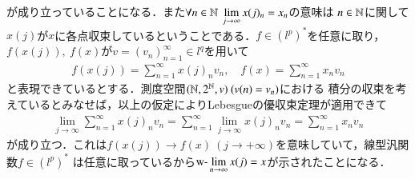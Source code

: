 \begin{prf}
\begin{description}
		が成り立っていることになる．また$\forall n \in \mathbb{N}\ \displaystyle \lim_{j \to \infty}x(j)_n = x_n$の意味は
		$n \in \mathbb{N}$に関して$x(j)$が$x$に各点収束しているということである．$f \in \left(l^p\right)^*$を任意に取り，
		$f(x(j)),\ f(x)$が$v=(v_n)_{n=1}^{\infty} \in l^q$を用いて
		\begin{align}
			f(x(j)) = \sum_{n=1}^{\infty} x(j)_n v_n,\quad f(x) = \sum_{n=1}^{\infty} x_n v_n
		\end{align}
		と表現できているとする．測度空間$(\mathbb{N}, 2^{\mathbb{N}}, v)\ (v(n) = v_n)$における
		積分の収束を考えているとみなせば，以上の仮定によりLebesgueの優収束定理が適用できて
		\begin{align}
			\lim_{j \to \infty} \sum_{n=1}^{\infty} x(j)_n v_n = \sum_{n=1}^{\infty} \lim_{j \to \infty} x(j)_n v_n = \sum_{n=1}^{\infty} x_n v_n
		\end{align}
		が成り立つ．これは$f(x(j)) \longrightarrow f(x)\ (j \longrightarrow +\infty)$を意味していて，線型汎関数$f \in \left(l^p\right)^*$
		は任意に取っているから$\displaystyle \mbox{w-}\lim_{n \to \infty} x(j) = x$が示されたことになる．
\end{description}
\end{prf}
